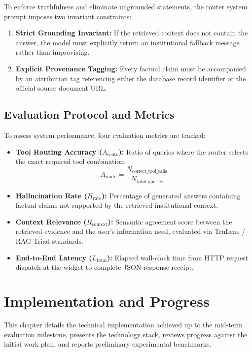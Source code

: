 \documentclass[12pt,a4paper]{report}
\begin{document}
To enforce truthfulness and eliminate ungrounded statements, the router system prompt imposes two invariant constraints:
\begin{enumerate}
    \item \textbf{Strict Grounding Invariant:} If the retrieved context does not contain the answer, the model must explicitly return an institutional fallback message rather than improvising.
    \item \textbf{Explicit Provenance Tagging:} Every factual claim must be accompanied by an attribution tag referencing either the database record identifier or the official source document URL.
\end{enumerate}

\section{Evaluation Protocol and Metrics}
To assess system performance, four evaluation metrics are tracked:
\begin{itemize}
    \item \textbf{Tool Routing Accuracy ($A_{\text{route}}$):} Ratio of queries where the router selects the exact required tool combination:
    \begin{equation}
    A_{\text{route}} = \frac{N_{\text{correct\_tool\_calls}}}{N_{\text{total\_queries}}}
    \end{equation}
    \item \textbf{Hallucination Rate ($H_{\text{rate}}$):} Percentage of generated answers containing factual claims not supported by the retrieved institutional context.
    \item \textbf{Context Relevance ($R_{\text{context}}$):} Semantic agreement score between the retrieved evidence and the user's information need, evaluated via TruLens / RAG Triad standards.
    \item \textbf{End-to-End Latency ($L_{\text{total}}$):} Elapsed wall-clock time from HTTP request dispatch at the widget to complete JSON response receipt.
\end{itemize}

\chapter{Implementation and Progress}

This chapter details the technical implementation achieved up to the mid-term evaluation milestone, presents the technology stack, reviews progress against the initial work plan, and reports preliminary experimental benchmarks.
\end{document}
